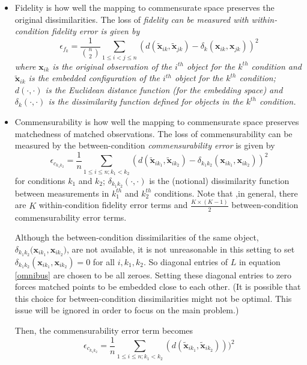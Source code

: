 \documentclass[11pt]{article} %
\begin{document}
\begin{itemize}
\item Fidelity is how well the mapping to commensurate space preserves the original dissimilarities. The loss of \em{fidelity} can be measured with  within-condition \em{ fidelity error} is given by
    \[
\epsilon_{f_{k}} = \frac{1}{{{n}\choose{2}}} \sum_{1 \leq i < j \leq n} (d(\widetilde{\bm{x}}_{ik},\widetilde{\bm{x}}_{jk})-\delta_k(\bm{x}_{ik},\bm{x}_{jk}))^2
\] 
where ${\bm{x}}_{ik}$ is the original observation of the $i^{th}$ object for the $k^{th}$  condition and $\widetilde{\bm{x}}_{ik}$ is the embedded configuration of the $i^{th}$ object  for the $k^{th}$ condition;  $d(\cdot,\cdot)$ is the Euclidean distance function (for the embedding space) and $\delta_k(\cdot,\cdot)$ is the dissimilarity function defined for objects in the $k^{th}$ condition.

\item Commensurability is how well the mapping to commensurate space preserves matchedness of matched observations. The loss of commensurability can be measured by the between-condition {\em commensurability error} is given by
    \[
\epsilon_{c_{k_1k_2}} = \frac{1}{n} \sum_{1 \leq i \leq n;k_1 <k_2} (d(\widetilde{\bm{x}}_{ik_1},\widetilde{\bm{x}}_{ik_2})-{ \delta_{k_1k_2}}(\bm{x}_{ik_1},\bm{x}_{ik_2}))^2
\label{comm-error}
\]
 for conditions $k_1$ and $k_2$; $\delta_{{k_1}{k_2}}(\cdot,\cdot)$ is the (notional) dissimilarity function between measurements in  $k_1^{th}$ and $k_2^{th}$ conditions. Note that ,in general, there are $K$  within-condition fidelity error terms and $\frac{K \times (K-1)}{2}$  between-condition commensurability error terms.

Although  the between-condition dissimilarities of the same object, ${ \delta_{k_1k_2}(\bm{x}_{ik_1},\bm{x}_{ik_2}})$, are not available,  it is not unreasonable in this setting  to set ${ \delta_{k_1k_2}}(\bm{x}_{ik_1},\bm{x}_{ik_2}) = 0$ for all $i,k_1,k_2$.  So diagonal  entries of $L$ in  equation \eqref{omnibus} are  chosen to be all zeroes. Setting these diagonal entries to zero forces matched points to be embedded close to each other. 
(It is possible that this choice for between-condition dissimilarities might not be optimal. This issue will be ignored in order to focus on the main problem.)

Then, the commensurability error  term becomes
  \[
\epsilon_{c_{k_1k_2}} = \frac{1}{n} \sum_{1 \leq i \leq n;k_1< k_2} (d(\widetilde{\bm{x}}_{ik_1},\widetilde{\bm{x}}_{ik_2})))^2
\]
\end{itemize}
\end{document}
